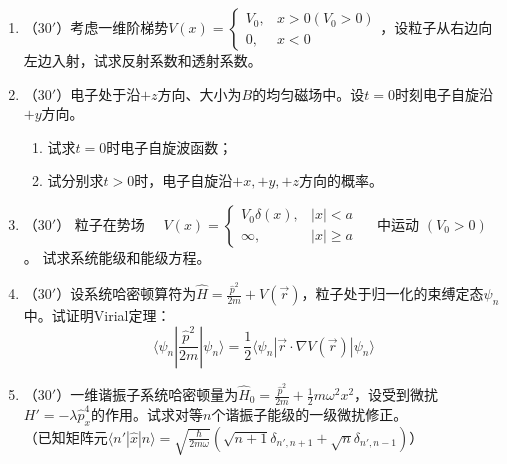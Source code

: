 

\begin{enumerate}
	\item
（$30'$）考虑一维阶梯势$V(x)=\begin{cases}V_0,&x>0(V_0>0)\\ 0,&x<0\end{cases}$，设粒子从右边向左边入射，试求反射系数和透射系数。


\banswer{
	
}


\item 
（$30'$）电子处于沿$+z$方向、大小为$B$的均匀磁场中。设$t=0$时刻电子自旋沿$+y$方向。
\begin{enumerate}
	\item
试求$t=0$时电子自旋波函数；

\item 
试分别求$t>0$时，电子自旋沿$+x,+y,+z$方向的概率。
	
\end{enumerate}

\banswer{
	
}


\item 
（$30'$）
粒子在势场 $\quad V(x)=\left\{\begin{array}{cl}V_{0} \delta(x), & |x|<a \\ \infty, & |x| \geq a\end{array} \quad\right.$ 中运动 $\left(V_{0}>0\right)$ 。 试求系统能级和能级方程。


\banswer{
	
}


\newpage
\item 
（$30'$）设系统哈密顿算符为$\hat{H}=\frac{\hat{p}^2}{2m}+V(\vec{r})$，粒子处于归一化的束缚定态$\psi_n$中。试证明Virial定理：
$$\langle \psi_n|\frac{\hat{p}^2}{2m}|\psi_n\rangle=\frac{1}{2}\langle\psi_n |\vec{r}\cdot\nabla V(\vec{r})|\psi_n\rangle$$

\banswer{
	
}


\item 
（$30'$）一维谐振子系统哈密顿量为$\hat{H}_0=\frac{\hat{p}^2}{2m}+\frac{1}{2}m\omega^2x^2$，设受到微扰$H'=-\lambda \hat{p}_x^4$的作用。试求对等$n$个谐振子能级的一级微扰修正。\\
（已知矩阵元$\langle n'|\hat{x}|n\rangle=\sqrt{\frac{\hbar}{2m\omega}}(\sqrt{n+1}\delta_{n',n+1}+\sqrt{n}\delta_{n',n-1})$）

\banswer{
	
}


\end{enumerate}

